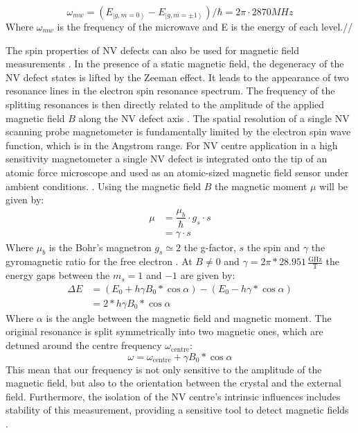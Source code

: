 \begin{equation}
\omega_{mw}=(E_{\left|g,m=0\right\rangle}-E_{\left|g,m=\pm 1\right\rangle})/ \hbar = 2\pi \cdot 2870MHz 
\end{equation}
Where $\omega_{mw}$ is the frequency of the microwave and E is the energy of each level.//

The spin properties of NV defects can also be used for magnetic field measurements \cite{sage_optical_2013}. In the presence of a static magnetic field, the degeneracy of the NV defect states is lifted by the Zeeman effect. It leads to the appearance of two resonance lines in the electron spin resonance spectrum. The frequency of the splitting resonances is then directly related to the amplitude of the applied magnetic field $B$ along the NV defect axis \cite{lesik_engineering_2015}. The spatial resolution of a single NV scanning probe magnetometer is fundamentally limited by the electron spin wave function, which is in the Angstrom range. For NV centre application in a high sensitivity magnetometer a single NV defect is integrated onto the tip of an atomic force microscope and used as an atomic-sized magnetic field sensor under ambient conditions. \cite{zhou_scanning_2017}.
Using the magnetic field $B$ the magnetic moment $\mu$ will be given by:
\begin{align}
\mu&=\dfrac{\mu_{b}}{\hbar}\cdot g_{s}\cdot s \\
&=\gamma\cdot s
\end{align}
Where $\mu_{b}$ is the Bohr's magnetron $g_{s}\simeq 2$ the g-factor, $s$ the spin and $\gamma$ the gyromagnetic ratio for the free electron \cite{meschede_gerthsen_2015}. At $B\neq 0$ and $\gamma=2\pi*28.951\,\mathrm{\frac{GHz}{T}}$ the energy gaps between the $m_{s}=1$ and $-1$ are given by:
\begin{align}
	\Delta E&=(E_{0}+h \gamma B_{0}*\cos\alpha)-(E_{0}-h \gamma*\cos\alpha) \\	
	&=2*h \gamma B_{0}*\cos\alpha
\end{align}
Where $\alpha $ is the angle between the magnetic field and magnetic moment. The original resonance is split symmetrically into two magnetic ones, which are detuned around the centre frequency $\omega_\text{centre}$:
\begin{equation}
	\omega=\omega_\text{centre}+\gamma B_{0}*\cos\alpha
\end{equation}
This mean that our frequency is not only sensitive to the amplitude of the magnetic field, but also to the orientation between the crystal and the external field. Furthermore, the isolation of the NV centre's intrinsic influences includes stability of this measurement, providing a sensitive tool to detect magnetic fields \cite{meschede_gerthsen_2015}.

